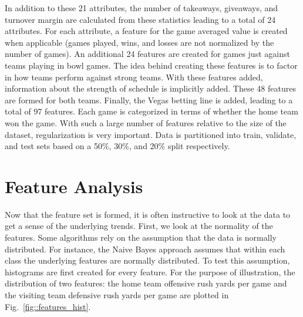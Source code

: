 \documentclass[12pt]{article}
\begin{document}
In addition to these 21 attributes, the number of takeaways, giveaways, and turnover margin are calculated from these statistics leading to a total of 24 attributes. For each attribute, a feature for the game averaged value is created when applicable (games played, wins, and losses are not normalized by the number of games). An additional 24 features are created for games just against teams playing in bowl games. The idea behind creating these features is to factor in how teams perform against strong teams. With these features added, information about the strength of schedule is implicitly added. These 48 features are formed for both teams. Finally, the Vegas betting line is added, leading to a total of 97 features. Each game is categorized in terms of whether the home team won the game. With such a large number of features relative to the size of the dataset, regularization is very important. Data is partitioned into train, validate, and test sets based on a 50\%, 30\%, and 20\% split respectively.

\section{Feature Analysis}
Now that the feature set is formed, it is often instructive to look at the data to get a sense of the underlying trends. First, we look at the normality of the features. Some algorithms rely on the assumption that the data is normally distributed. For instance, the Naive Bayes approach assumes that within each class the underlying features are normally distributed. To test this assumption, histograms are first created for every feature. For the purpose of illustration, the distribution of two features: the home team offensive rush yards per game and the visiting team defensive rush yards per game are plotted in Fig.~\ref{fig::features_hist}.
\end{document}
